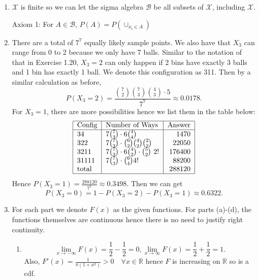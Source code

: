 \documentclass{article}
\begin{document}
\begin{enumerate}
    \item $\mathcal{X}$ is finite so we can let the sigma algebra $\mathcal{B}$ be all subsets 
    of $\mathcal{X}$, including $\mathcal{X}$.

    Axiom 1: For $A \in \mathcal{B}$, $P(A) = P(\cup_{x_i \in A} )$

    \item There are a total of $7^7$ equally likely sample points. We also have that $X_3$ can 
    range from 0 to 2 because we only have 7 balls. Similar to the notation of that in Exercise 
    1.20, $X_3 = 2$ can only happen if 2 bins have exactly 3 balls and 1 bin has exactly 1 ball. 
    We denote this configuration as 311. Then by a similar calculation as before, 
    \[ P(X_3 = 2) = \frac{\binom{7}{2}\binom{7}{3}\binom{4}{3} \cdot 5}{7^7} \approx 0.0178. \]
    For $X_3 = 1$, there are more possibilities hence we list them in the table below: 
    \[ \begin{tabular}{|l|l|r|}
        \hline
        \text{Config} & \text{Number of Ways} & \text{Answer} \\
        \hline
        34 & $7\binom{7}{3} \cdot 6\binom{4}{4}$ & 1470 \\
        322 & $7\binom{7}{3} \cdot \binom{6}{2}\binom{4}{2}\binom{2}{2}$ & 22050 \\
        3211 & $7\binom{7}{3} \cdot 6\binom{4}{2} \cdot \binom{5}{2}$ 2! & 176400 \\
        31111 & $7\binom{7}{3} \cdot \binom{6}{4}4!$ & 88200 \\
        total & & 288120 \\
        \hline
    \end{tabular} \]
    Hence $P(X_3 = 1) = \frac{288120}{7^7} \approx 0.3498$. Then we can get 
    \[ P(X_3 = 0) = 1 - P(X_3 = 2) - P(X_3 = 1) \approx 0.6322. \]

    \item For each part we denote $F(x)$ as the given functions. For parts (a)-(d), the 
    functions themselves are continuous hence there is no need to justify right continuity.
    \begin{enumerate}
        \item \[ \lim_{x \to -\infty} F(x) = \frac{1}{2} - \frac{1}{2} = 0, 
        \lim_{x \to \infty} F(x) = \frac{1}{2} + \frac{1}{2} = 1. \]
        Also, $F'(x) = \frac{1}{\pi (1 + x^2)} > 0 \quad \forall x \in \mathbb{R}$ hence $F$ is 
        increasing on $\mathbb{R}$ so is a cdf.


\end{enumerate}
\end{enumerate}
\end{document}
